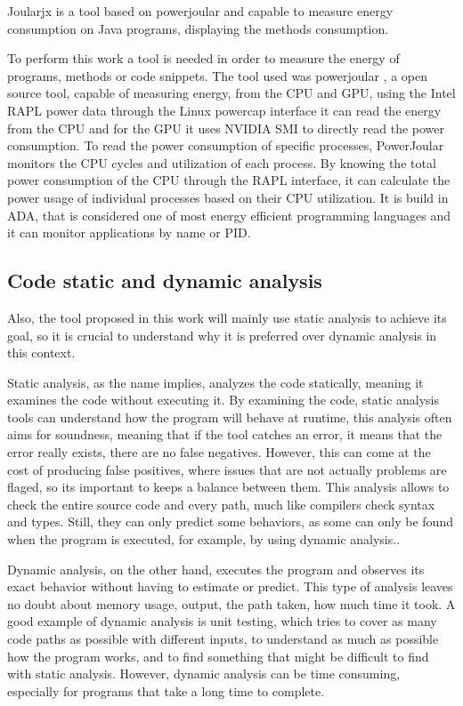 \documentclass[sigplan]{acmart}
\begin{document}
Joularjx is a tool based on powerjoular and capable to measure energy consumption on Java programs, displaying the methods consumption.

To perform this work a tool is needed in order to measure the energy of programs, methods or code snippets. The tool used was powerjoular \cite{noureddine-ie-2022}, a open source tool, capable of measuring energy, from the CPU and GPU, using the Intel RAPL power data through the Linux powercap interface it can read the energy from the CPU and for the GPU it uses NVIDIA SMI to directly read the power consumption.
To read the power consumption of specific processes, PowerJoular monitors the CPU cycles and utilization of each process. By knowing the total power consumption of the CPU through the RAPL interface, it can calculate the power usage of individual processes based on their CPU utilization.
It is build in ADA, that is considered one of most energy efficient programming languages and it can monitor applications by name or PID.


\subsection{Code static and dynamic analysis} \label{sec:background_static_dynamic_analysis}
Also, the tool proposed in this work will mainly use static analysis to achieve its goal, so it is crucial to understand why it is preferred over dynamic analysis in this context.

Static analysis, as the name implies, analyzes the code statically, meaning it examines the code without executing it. By examining the code, static analysis tools can understand how the program will behave at runtime\cite{ernst2003static}, this analysis often aims for soundness, meaning that if the tool catches an error, it means that the error really exists, there are no false negatives. However, this can come at the cost of producing false positives, where issues that are not actually problems are flaged, so its important to keeps a balance between them. This analysis allows to check the entire source code and every path, much like compilers check syntax and types. Still, they can only predict some behaviors, as some can only be found when the program is executed, for example, by using dynamic analysis..

Dynamic analysis, on the other hand, executes the program and observes its exact behavior without having to estimate or predict. This type of analysis leaves no doubt about memory usage, output, the path taken, how much time it took\cite{ernst2003static}. A good example of dynamic analysis is unit testing, which tries to cover as many code paths as possible with different inputs, to understand as much as possible how the program works, and to find something that might be difficult to find with static analysis. However, dynamic analysis can be time consuming, especially for programs that take a long time to complete.
\end{document}
